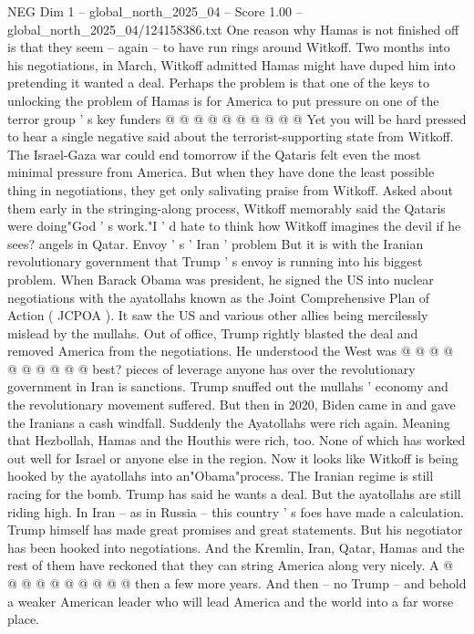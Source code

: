 \begin{textsample}{NEG Dim 1 – global\_north\_2025\_04 – Score 1.00 – global\_north\_2025\_04/124158386.txt}
One reason why Hamas is not finished off is that they seem -- again -- to have run rings around Witkoff.
Two months into his negotiations, in March, Witkoff admitted Hamas might have duped him into pretending it wanted a deal.
Perhaps the problem is that one of the keys to unlocking the problem of Hamas is for America to put pressure on one of the terror group ' s key funders @ @ @ @ @ @ @ @ @ @ Yet you will be hard pressed to hear a single negative said about the terrorist-supporting state from Witkoff.
The Israel-Gaza war could end tomorrow if the Qataris felt even the most minimal pressure from America.
But when they have done the least possible thing in negotiations, they get only salivating praise from Witkoff.
Asked about them early in the stringing-along process, Witkoff memorably said the Qataris were doing"God ' s work."I ' d hate to think how Witkoff imagines the devil if he sees? angels in Qatar.
Envoy ' s ' Iran ' problem But it is with the Iranian revolutionary government that Trump ' s envoy is running into his biggest problem.
When Barack Obama was president, he signed the US into nuclear negotiations with the ayatollahs known as the Joint Comprehensive Plan of Action ( JCPOA ).
It saw the US and various other allies being mercilessly mislead by the mullahs.
Out of office, Trump rightly blasted the deal and removed America from the negotiations.
He understood the West was @ @ @ @ @ @ @ @ @ @ best? pieces of leverage anyone has over the revolutionary government in Iran is sanctions.
Trump snuffed out the mullahs ' economy and the revolutionary movement suffered.
But then in 2020, Biden came in and gave the Iranians a cash windfall.
Suddenly the Ayatollahs were rich again.
Meaning that Hezbollah, Hamas and the Houthis were rich, too.
None of which has worked out well for Israel or anyone else in the region.
Now it looks like Witkoff is being hooked by the ayatollahs into an"Obama"process.
The Iranian regime is still racing for the bomb.
Trump has said he wants a deal.
But the ayatollahs are still riding high.
In Iran -- as in Russia -- this country ' s foes have made a calculation.
Trump himself has made great promises and great statements.
But his negotiator has been hooked into negotiations.
And the Kremlin, Iran, Qatar, Hamas and the rest of them have reckoned that they can string America along very nicely.
A @ @ @ @ @ @ @ @ @ @ then a few more years.
And then -- no Trump -- and behold a weaker American leader who will lead America and the world into a far worse place.

\end{textsample}

